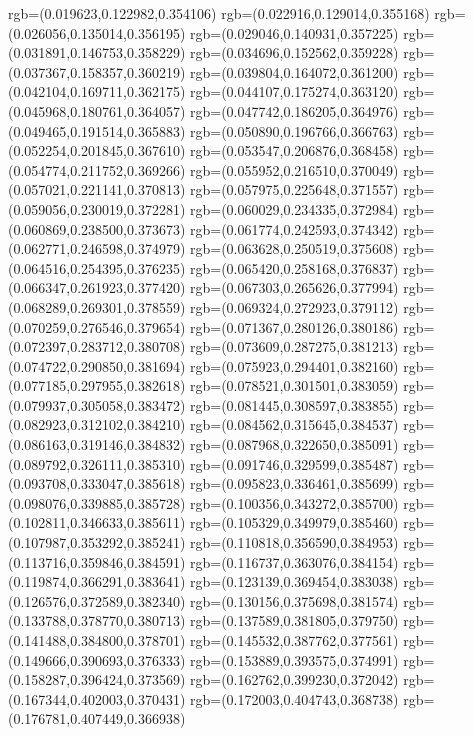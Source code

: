 {{{			rgb=(0.019623,0.122982,0.354106)
			rgb=(0.022916,0.129014,0.355168)
			rgb=(0.026056,0.135014,0.356195)
			rgb=(0.029046,0.140931,0.357225)
			rgb=(0.031891,0.146753,0.358229)
			rgb=(0.034696,0.152562,0.359228)
			rgb=(0.037367,0.158357,0.360219)
			rgb=(0.039804,0.164072,0.361200)
			rgb=(0.042104,0.169711,0.362175)
			rgb=(0.044107,0.175274,0.363120)
			rgb=(0.045968,0.180761,0.364057)
			rgb=(0.047742,0.186205,0.364976)
			rgb=(0.049465,0.191514,0.365883)
			rgb=(0.050890,0.196766,0.366763)
			rgb=(0.052254,0.201845,0.367610)
			rgb=(0.053547,0.206876,0.368458)
			rgb=(0.054774,0.211752,0.369266)
			rgb=(0.055952,0.216510,0.370049)
			rgb=(0.057021,0.221141,0.370813)
			rgb=(0.057975,0.225648,0.371557)
			rgb=(0.059056,0.230019,0.372281)
			rgb=(0.060029,0.234335,0.372984)
			rgb=(0.060869,0.238500,0.373673)
			rgb=(0.061774,0.242593,0.374342)
			rgb=(0.062771,0.246598,0.374979)
			rgb=(0.063628,0.250519,0.375608)
			rgb=(0.064516,0.254395,0.376235)
			rgb=(0.065420,0.258168,0.376837)
			rgb=(0.066347,0.261923,0.377420)
			rgb=(0.067303,0.265626,0.377994)
			rgb=(0.068289,0.269301,0.378559)
			rgb=(0.069324,0.272923,0.379112)
			rgb=(0.070259,0.276546,0.379654)
			rgb=(0.071367,0.280126,0.380186)
			rgb=(0.072397,0.283712,0.380708)
			rgb=(0.073609,0.287275,0.381213)
			rgb=(0.074722,0.290850,0.381694)
			rgb=(0.075923,0.294401,0.382160)
			rgb=(0.077185,0.297955,0.382618)
			rgb=(0.078521,0.301501,0.383059)
			rgb=(0.079937,0.305058,0.383472)
			rgb=(0.081445,0.308597,0.383855)
			rgb=(0.082923,0.312102,0.384210)
			rgb=(0.084562,0.315645,0.384537)
			rgb=(0.086163,0.319146,0.384832)
			rgb=(0.087968,0.322650,0.385091)
			rgb=(0.089792,0.326111,0.385310)
			rgb=(0.091746,0.329599,0.385487)
			rgb=(0.093708,0.333047,0.385618)
			rgb=(0.095823,0.336461,0.385699)
			rgb=(0.098076,0.339885,0.385728)
			rgb=(0.100356,0.343272,0.385700)
			rgb=(0.102811,0.346633,0.385611)
			rgb=(0.105329,0.349979,0.385460)
			rgb=(0.107987,0.353292,0.385241)
			rgb=(0.110818,0.356590,0.384953)
			rgb=(0.113716,0.359846,0.384591)
			rgb=(0.116737,0.363076,0.384154)
			rgb=(0.119874,0.366291,0.383641)
			rgb=(0.123139,0.369454,0.383038)
			rgb=(0.126576,0.372589,0.382340)
			rgb=(0.130156,0.375698,0.381574)
			rgb=(0.133788,0.378770,0.380713)
			rgb=(0.137589,0.381805,0.379750)
			rgb=(0.141488,0.384800,0.378701)
			rgb=(0.145532,0.387762,0.377561)
			rgb=(0.149666,0.390693,0.376333)
			rgb=(0.153889,0.393575,0.374991)
			rgb=(0.158287,0.396424,0.373569)
			rgb=(0.162762,0.399230,0.372042)
			rgb=(0.167344,0.402003,0.370431)
			rgb=(0.172003,0.404743,0.368738)
			rgb=(0.176781,0.407449,0.366938)
}}}
